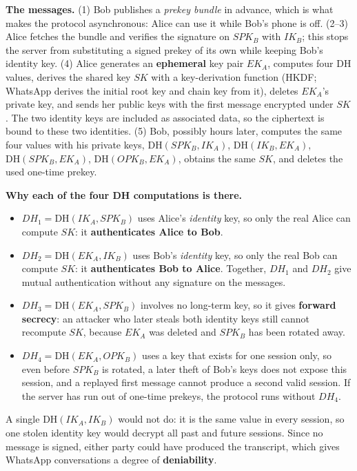 \textbf{The messages.} (1) Bob publishes a \emph{prekey bundle} in advance, which is what makes the protocol asynchronous: Alice can use it while Bob's phone is off. (2--3) Alice fetches the bundle and verifies the signature on $SPK_B$ with $IK_B$; this stops the server from substituting a signed prekey of its own while keeping Bob's identity key. (4) Alice generates an \textbf{ephemeral} key pair $EK_A$, computes four DH values, derives the shared key $SK$ with a key-derivation function (HKDF; WhatsApp derives the initial root key and chain key from it), deletes $EK_A$'s private key, and sends her public keys with the first message encrypted under $SK$. The two identity keys are included as associated data, so the ciphertext is bound to these two identities. (5) Bob, possibly hours later, computes the same four values with his private keys, $\mathrm{DH}(SPK_B, IK_A)$, $\mathrm{DH}(IK_B, EK_A)$, $\mathrm{DH}(SPK_B, EK_A)$, $\mathrm{DH}(OPK_B, EK_A)$, obtains the same $SK$, and deletes the used one-time prekey.

\textbf{Why each of the four DH computations is there.}
\begin{itemize}[leftmargin=1.4em]
  \item $DH_1 = \mathrm{DH}(IK_A, SPK_B)$ uses Alice's \emph{identity} key, so only the real Alice can compute $SK$: it \textbf{authenticates Alice to Bob}.
  \item $DH_2 = \mathrm{DH}(EK_A, IK_B)$ uses Bob's \emph{identity} key, so only the real Bob can compute $SK$: it \textbf{authenticates Bob to Alice}. Together, $DH_1$ and $DH_2$ give mutual authentication without any signature on the messages.
  \item $DH_3 = \mathrm{DH}(EK_A, SPK_B)$ involves no long-term key, so it gives \textbf{forward secrecy}: an attacker who later steals both identity keys still cannot recompute $SK$, because $EK_A$ was deleted and $SPK_B$ has been rotated away.
  \item $DH_4 = \mathrm{DH}(EK_A, OPK_B)$ uses a key that exists for one session only, so even before $SPK_B$ is rotated, a later theft of Bob's keys does not expose this session, and a replayed first message cannot produce a second valid session. If the server has run out of one-time prekeys, the protocol runs without $DH_4$.
\end{itemize}
A single $\mathrm{DH}(IK_A, IK_B)$ would not do: it is the same value in every session, so one stolen identity key would decrypt all past and future sessions. Since no message is signed, either party could have produced the transcript, which gives WhatsApp conversations a degree of \textbf{deniability}.

